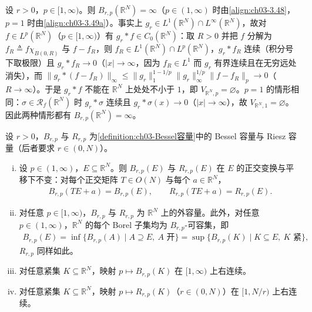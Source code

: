 \documentclass[../../main.tex]{subfiles}%
\begin{document}
\begin{example}\label{example:ch03-全空间容量无穷}
设 $r>0$，$p\in[1,\infty)$。则 $B_{r,p}(\mathbb{R}^N)=\infty$（$p\in(1,\infty)$ 时由\eqref{align:ch03-3.48}，$p=1$ 时由\eqref{align:ch03-3.49a}）。事实上 $g_r\in L^1(\mathbb{R}^N)\cap L^\infty(\mathbb{R}^N)$，故对 $f\in L^p(\mathbb{R}^N)$（$p\in[1,\infty)$）有 $g_r*f\in C_0(\mathbb{R}^N)$：取 $R>0$ 并把 $f$ 分解为 $f_R\triangleq f\chi_{B(0,R)}$ 与 $f-f_R$，则 $f_R\in L^1(\mathbb{R}^N)\cap L^p(\mathbb{R}^N)$，$g_r*f_R$ 连续（积分号下取极限）且 $g_r*f_R\to0$（$|x|\to\infty$，因为 $f_R\in L^1$ 而 $g_r$ 有界连续且在无穷远处消失），而 $\|g_r*(f-f_R)\|_\infty\leqslant\|g_r\|_1^{1-1/p}\|g_r\|_\infty^{1/p}\|f-f_R\|_p\to0$（$R\to\infty$）。于是 $g_r*f$ 不能在 $\mathbb{R}^N$ 上处处不小于 $1$，即 $V_{\mathbb{R}^N,p}=\varnothing$。$p=1$ 的情形相同：$\sigma\in\mathscr{R}_f(\mathbb{R}^N)$ 时 $g_r*\sigma$ 连续且 $g_r*\sigma(x)\to0$（$|x|\to\infty$），故 $V_{\mathbb{R}^N,1}=\varnothing$。因此两种情形都有 $B_{r,p}(\mathbb{R}^N)=\infty$。
\end{example}

\begin{proposition}\label{proposition:ch03-Bessel基本}
设 $r>0$，$B_{r,p}$ 与 $R_{r,p}$ 为\cref{definition:ch03-Bessel容量}中的 Bessel 容量与 Riesz 容量（后者要求 $r\in(0,N)$）。
\begin{enumerate}[(i)]
\item 设 $p\in(1,\infty)$，$E\subseteq\mathbb{R}^N$。则 $B_{r,p}(E)$ 与 $R_{r,p}(E)$ 在 $E$ 的正交变换与平移下不变：对每个正交矩阵 $T\in O(N)$ 与每个 $a\in\mathbb{R}^N$，
\begin{align*}
B_{r,p}(TE+a)=B_{r,p}(E),\qquad R_{r,p}(TE+a)=R_{r,p}(E).
\end{align*}
\item 对任意 $p\in[1,\infty)$，$B_{r,p}$ 与 $R_{r,p}$ 为 $\mathbb{R}^N$ 上的外容量。此外，对任意 $p\in(1,\infty)$，$\mathbb{R}^N$ 的每个 Borel 子集均为 $B_{r,p}$-可容集，即
\begin{align*}
B_{r,p}(E)=\inf\{B_{r,p}(A)\mid A\supseteq E,\ A\text{ 开}\}=\sup\{B_{r,p}(K)\mid K\subseteq E,\ K\text{ 紧}\},
\end{align*}
$R_{r,p}$ 同样如此。
\item 对任意紧集 $K\subseteq\mathbb{R}^N$，映射 $p\mapsto B_{r,p}(K)$ 在 $[1,\infty)$ 上右连续。
\item 对任意紧集 $K\subseteq\mathbb{R}^N$，映射 $p\mapsto R_{r,p}(K)$（$r\in(0,N)$）在 $[1,N/r)$ 上右连续。
\end{enumerate}
\end{proposition}
\end{document}
